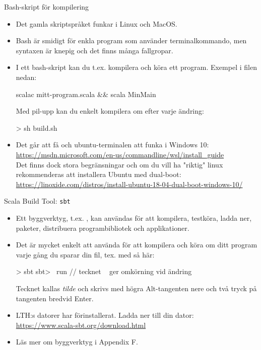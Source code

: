 \begin{Slide}{Bash-skript för kompilering}\SlideFontSmall
\begin{itemize}
  \item Det gamla skriptspråket  funkar i Linux och MacOS.
  \item Bash är smidigt för enkla program som använder terminalkommando, men syntaxen är knepig och det finns många fallgropar.
  \item I ett bash-skript kan du t.ex. kompilera och köra ett program. Exempel i filen  nedan:
\begin{Code}
scalac mitt-program.scala && scala MinMain
\end{Code}
Med pil-upp kan du enkelt kompilera om efter varje ändring:
\begin{REPLnonum}
> sh build.sh
\end{REPLnonum}
  \item Det går att få  och ubuntu-terminalen att funka i Windows 10: \\
  {\SlideFontTiny\url{https://msdn.microsoft.com/en-us/commandline/wsl/install_guide}} \\
  Det finns dock stora begränsningar och om du vill ha "riktig" linux rekommenderas att installera Ubuntu med dual-boot: \\
  {\SlideFontTiny\url{https://linoxide.com/distros/install-ubuntu-18-04-dual-boot-windows-10/}}
\end{itemize}
\end{Slide}

\begin{Slide}{Scala Build Tool: \texttt{sbt}}
\begin{itemize}
  \item Ett byggverktyg, t.ex. , kan användas för att kompilera, testköra, ladda ner, paketer, distribuera programbibliotek och applikationer.
  \item Det är mycket enkelt att använda  för att kompilera och köra om ditt program varje gång du sparar din fil, tex. med  så här:
\begin{REPLnonum}
> sbt
sbt> ~run   // tecknet ~ ger omkörning vid ändring
\end{REPLnonum}
Tecknet \code{~} kallas \emph{tilde} och skrivs med högra Alt-tangenten nere och två tryck på tangenten bredvid Enter.
  \item LTH:s datorer har  förinstallerat. Ladda ner till din dator: \\
  \url{https://www.scala-sbt.org/download.html}
  \item Läs mer om byggverktyg i Appendix F.

\end{itemize}

\end{Slide}


